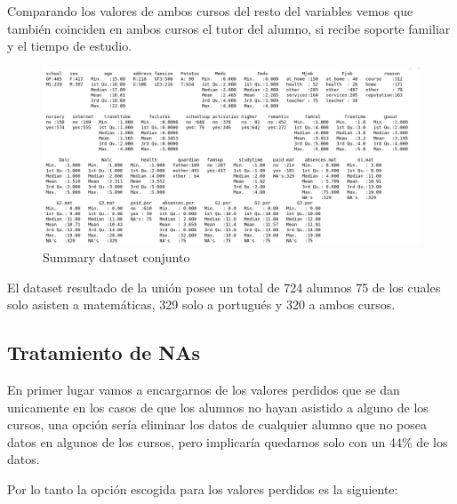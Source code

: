 \documentclass[12pt,a4paper]{article}
\begin{document}
Comparando los valores de ambos cursos del resto del variables vemos que también coinciden en ambos cursos el tutor del alumno, si recibe soporte familiar y el tiempo de estudio. 


 \begin{figure}[ht!]
	\centering
	\includegraphics[trim = 0mm 0mm 0mm 0mm, clip,scale=0.4]{images/summary_inicial}
	\caption{Summary dataset conjunto}
	\label{fig:sum1}
\end{figure}


El dataset resultado de la unión posee un total de 724 alumnos 75 de los cuales solo asisten a matemáticas, 329 solo a portugués y  320 a ambos cursos.


\subsection{Tratamiento de NAs}
En primer lugar vamos a encargarnos de los valores perdidos que se dan unicamente en los casos de que los alumnos no hayan asistido a alguno de los cursos, una opción sería eliminar los datos de cualquier alumno que no posea datos en algunos de los cursos, pero implicaría quedarnos solo con un 44\% de los datos. 

Por lo tanto la opción escogida para los valores perdidos es la siguiente: 
\end{document}
